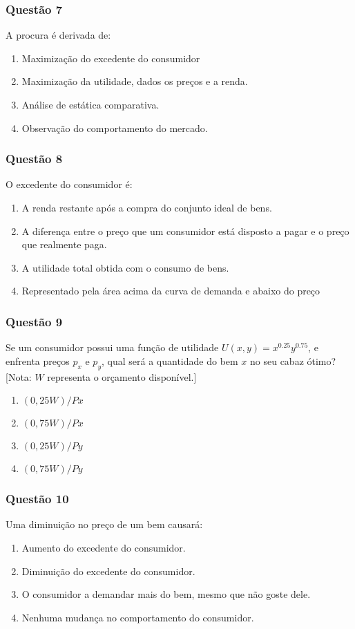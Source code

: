     \begin{frame}
    \frametitle{Questão 7}
    
    A procura é derivada de: 
    \begin{enumerate}
    \item Maximização do excedente do consumidor 
    \item Maximização da utilidade, dados os preços e a renda. 
    \item Análise de estática comparativa. 
    \item Observação do comportamento do mercado.
\end{enumerate}
\end{frame}
    
    \begin{frame}
    \frametitle{Questão 8}
    
    O excedente do consumidor é: 
    \begin{enumerate}
    \item A renda restante após a compra do conjunto ideal de bens. 
    \item A diferença entre o preço que um consumidor está disposto a pagar e o preço que realmente paga. 
    \item A utilidade total obtida com o consumo de bens. 
    \item Representado pela área acima da curva de demanda e abaixo do preço
\end{enumerate}
\end{frame}
    
    \begin{frame}
    \frametitle{Questão 9}
    
    Se um consumidor possui uma função de utilidade $U(x, y) = x^{0.25} y^{0.75}$, e enfrenta preços $p_x$ e $p_y$, qual será a quantidade do bem $x$ no seu cabaz \'otimo? [Nota: $W$ representa o or\c camento dispon\'ivel.] 
    \begin{enumerate}
    \item $(0,25 W) / Px $
    \item $(0,75 W) / Px $
    \item $(0,25 W) / Py $
    \item $(0,75 W) / Py$
\end{enumerate}
\end{frame}
    
    \begin{frame}
    \frametitle{Questão 10}
    
    Uma diminuição no preço de um bem causará: 
    \begin{enumerate}
    \item Aumento do excedente do consumidor. 
    \item Diminuição do excedente do consumidor. 
    \item O consumidor a demandar mais do bem, mesmo que não goste dele. 
    \item Nenhuma mudança no comportamento do consumidor.
\end{enumerate}
\end{frame}